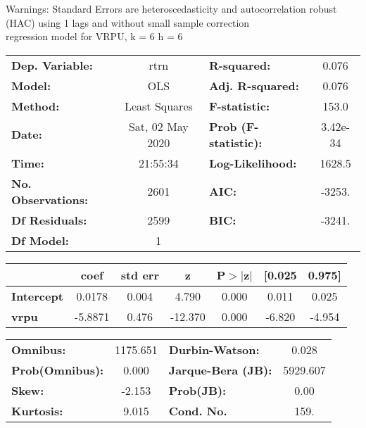 Warnings: \newline
 [1] Standard Errors are heteroscedasticity and autocorrelation robust (HAC) using 1 lags and without small sample correction\\ 

regression model for VRPU, k = 6 h = 6\begin{center}
\begin{tabular}{lclc}
\toprule
\textbf{Dep. Variable:}    &       rtrn       & \textbf{  R-squared:         } &     0.076   \\
\textbf{Model:}            &       OLS        & \textbf{  Adj. R-squared:    } &     0.076   \\
\textbf{Method:}           &  Least Squares   & \textbf{  F-statistic:       } &     153.0   \\
\textbf{Date:}             & Sat, 02 May 2020 & \textbf{  Prob (F-statistic):} &  3.42e-34   \\
\textbf{Time:}             &     21:55:34     & \textbf{  Log-Likelihood:    } &    1628.5   \\
\textbf{No. Observations:} &        2601      & \textbf{  AIC:               } &    -3253.   \\
\textbf{Df Residuals:}     &        2599      & \textbf{  BIC:               } &    -3241.   \\
\textbf{Df Model:}         &           1      & \textbf{                     } &             \\
\bottomrule
\end{tabular}
\begin{tabular}{lcccccc}
                   & \textbf{coef} & \textbf{std err} & \textbf{z} & \textbf{P$> |$z$|$} & \textbf{[0.025} & \textbf{0.975]}  \\
\midrule
\textbf{Intercept} &       0.0178  &        0.004     &     4.790  &         0.000        &        0.011    &        0.025     \\
\textbf{vrpu}      &      -5.8871  &        0.476     &   -12.370  &         0.000        &       -6.820    &       -4.954     \\
\bottomrule
\end{tabular}
\begin{tabular}{lclc}
\textbf{Omnibus:}       & 1175.651 & \textbf{  Durbin-Watson:     } &    0.028  \\
\textbf{Prob(Omnibus):} &   0.000  & \textbf{  Jarque-Bera (JB):  } & 5929.607  \\
\textbf{Skew:}          &  -2.153  & \textbf{  Prob(JB):          } &     0.00  \\
\textbf{Kurtosis:}      &   9.015  & \textbf{  Cond. No.          } &     159.  \\
\bottomrule
\end{tabular}
\end{center}

